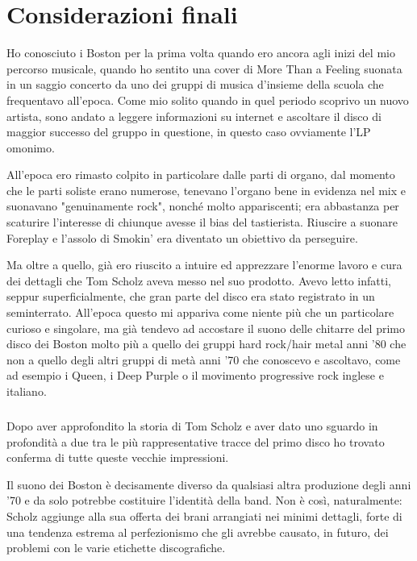 \documentclass[class=book, crop=false, oneside, 12pt]{standalone}
\begin{document}
\chapter*{Considerazioni finali}
Ho conosciuto i Boston per la prima volta quando ero ancora agli inizi del mio percorso musicale, quando ho sentito una cover di More Than a Feeling suonata in un saggio concerto da uno dei gruppi di musica d'insieme della scuola che frequentavo all'epoca. Come mio solito quando in quel periodo scoprivo un nuovo artista, sono andato a leggere informazioni su internet e ascoltare il disco di maggior successo del gruppo in questione, in questo caso ovviamente l'LP omonimo. 

All'epoca ero rimasto colpito in particolare dalle parti di organo, dal momento che le parti soliste erano numerose, tenevano l'organo bene in evidenza nel mix e suonavano "genuinamente rock", nonché molto appariscenti; era abbastanza per scaturire l'interesse di chiunque avesse il bias del tastierista. Riuscire a suonare Foreplay e l'assolo di Smokin' era diventato un obiettivo da perseguire.

Ma oltre a quello, già ero riuscito a intuire ed apprezzare l'enorme lavoro e cura dei dettagli che Tom Scholz aveva messo nel suo prodotto. Avevo letto infatti, seppur superficialmente, che gran parte del disco era stato  registrato in un seminterrato. All'epoca questo mi appariva come niente più che un particolare curioso e singolare, ma già tendevo ad accostare il suono delle chitarre del primo disco dei Boston molto più a quello dei gruppi hard rock/hair metal anni '80 che non a quello degli altri gruppi di metà anni '70 che conoscevo e ascoltavo, come ad esempio i Queen, i Deep Purple o il movimento progressive rock inglese e italiano.

\paragraph{}
Dopo aver approfondito la storia di Tom Scholz e aver dato uno sguardo in profondità a due tra le più rappresentative tracce del primo disco ho trovato conferma di tutte queste vecchie impressioni. 

Il suono dei Boston è decisamente diverso da qualsiasi altra produzione degli anni '70 e da solo potrebbe costituire l'identità della  band. Non è così, naturalmente: Scholz aggiunge alla sua offerta dei brani arrangiati nei minimi dettagli, forte di una tendenza estrema al perfezionismo che gli avrebbe causato, in futuro, dei problemi con le varie etichette discografiche.
\end{document}
